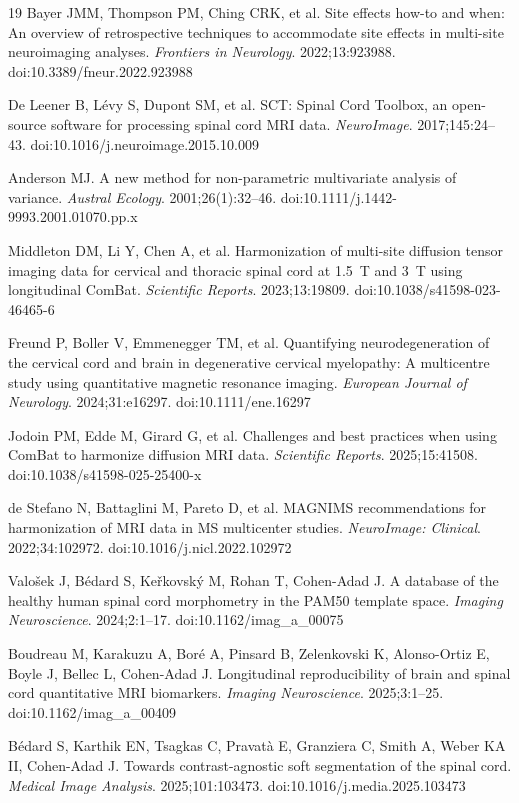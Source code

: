 \documentclass[12pt,a4paper]{article}
\begin{document}
\begin{thebibliography}{19}
Bayer JMM, Thompson PM, Ching CRK, et al.
Site effects how-to and when: An overview of retrospective techniques to accommodate site effects in multi-site neuroimaging analyses.
\textit{Frontiers in Neurology}. 2022;13:923988. doi:10.3389/fneur.2022.923988

De Leener B, L\'{e}vy S, Dupont SM, et al.
SCT: Spinal Cord Toolbox, an open-source software for processing spinal cord MRI data.
\textit{NeuroImage}. 2017;145:24--43. doi:10.1016/j.neuroimage.2015.10.009

Anderson MJ.
A new method for non-parametric multivariate analysis of variance.
\textit{Austral Ecology}. 2001;26(1):32--46. doi:10.1111/j.1442-9993.2001.01070.pp.x

Middleton DM, Li Y, Chen A, et al.
Harmonization of multi-site diffusion tensor imaging data for cervical and thoracic spinal cord at 1.5~T and 3~T using longitudinal ComBat.
\textit{Scientific Reports}. 2023;13:19809. doi:10.1038/s41598-023-46465-6

Freund P, Boller V, Emmenegger TM, et al.
Quantifying neurodegeneration of the cervical cord and brain in degenerative cervical myelopathy: A multicentre study using quantitative magnetic resonance imaging.
\textit{European Journal of Neurology}. 2024;31:e16297. doi:10.1111/ene.16297

Jodoin PM, Edde M, Girard G, et al.
Challenges and best practices when using ComBat to harmonize diffusion MRI data.
\textit{Scientific Reports}. 2025;15:41508. doi:10.1038/s41598-025-25400-x

de Stefano N, Battaglini M, Pareto D, et al.
MAGNIMS recommendations for harmonization of MRI data in MS multicenter studies.
\textit{NeuroImage: Clinical}. 2022;34:102972. doi:10.1016/j.nicl.2022.102972

Valo\v{s}ek J, B\'{e}dard S, Ke\v{r}kovsk\'{y} M, Rohan T, Cohen-Adad J.
A database of the healthy human spinal cord morphometry in the PAM50 template space.
\textit{Imaging Neuroscience}. 2024;2:1--17. doi:10.1162/imag\_a\_00075

Boudreau M, Karakuzu A, Bor\'{e} A, Pinsard B, Zelenkovski K, Alonso-Ortiz E, Boyle J, Bellec L, Cohen-Adad J.
Longitudinal reproducibility of brain and spinal cord quantitative MRI biomarkers.
\textit{Imaging Neuroscience}. 2025;3:1--25. doi:10.1162/imag\_a\_00409

B\'{e}dard S, Karthik EN, Tsagkas C, Pravat\`{a} E, Granziera C, Smith A, Weber KA II, Cohen-Adad J.
Towards contrast-agnostic soft segmentation of the spinal cord.
\textit{Medical Image Analysis}. 2025;101:103473. doi:10.1016/j.media.2025.103473

\end{thebibliography}
\end{document}
